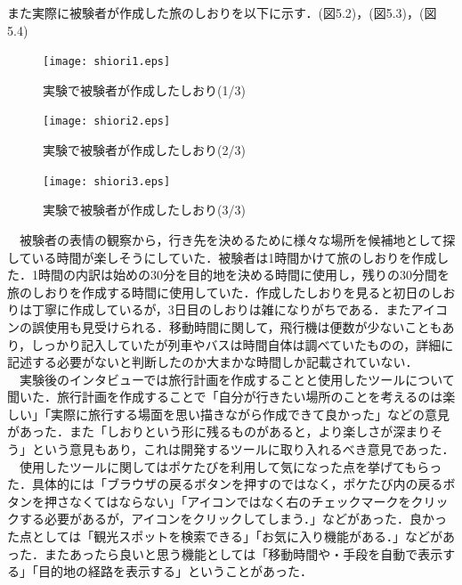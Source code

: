 \documentclass{funthesis}
\begin{document}
また実際に被験者が作成した旅のしおりを以下に示す．(図5.2)，(図5.3)，(図5.4)

\begin{figure}[htpb]
\begin{center}
\texttt{[image: shiori1.eps]}
\caption{実験で被験者が作成したしおり(1/3)}
\end{center}
\end{figure}

\begin{figure}[htpb]
\begin{center}
\texttt{[image: shiori2.eps]}
\caption{実験で被験者が作成したしおり(2/3)}
\end{center}
\end{figure}

\begin{figure}[htpb]
\begin{center}
\texttt{[image: shiori3.eps]}
\caption{実験で被験者が作成したしおり(3/3)}
\end{center}
\end{figure}

\clearpage

　被験者の表情の観察から，行き先を決めるために様々な場所を候補地として探している時間が楽しそうにしていた．被験者は1時間かけて旅のしおりを作成した．1時間の内訳は始めの30分を目的地を決める時間に使用し，残りの30分間を旅のしおりを作成する時間に使用していた．作成したしおりを見ると初日のしおりは丁寧に作成しているが，3日目のしおりは雑になりがちである．またアイコンの誤使用も見受けられる．移動時間に関して，飛行機は便数が少ないこともあり，しっかり記入していたが列車やバスは時間自体は調べていたものの，詳細に記述する必要がないと判断したのか大まかな時間しか記載されていない．\\
　実験後のインタビューでは旅行計画を作成することと使用したツールについて聞いた．旅行計画を作成することで「自分が行きたい場所のことを考えるのは楽しい」「実際に旅行する場面を思い描きながら作成できて良かった」などの意見があった．また「しおりという形に残るものがあると，より楽しさが深まりそう」という意見もあり，これは開発するツールに取り入れるべき意見であった．\\
　使用したツールに関してはポケたびを利用して気になった点を挙げてもらった．具体的には「ブラウザの戻るボタンを押すのではなく，ポケたび内の戻るボタンを押さなくてはならない」「アイコンではなく右のチェックマークをクリックする必要があるが，アイコンをクリックしてしまう．」などがあった．良かった点としては「観光スポットを検索できる」「お気に入り機能がある．」などがあった．またあったら良いと思う機能としては「移動時間や・手段を自動で表示する」「目的地の経路を表示する」ということがあった．
\end{document}
